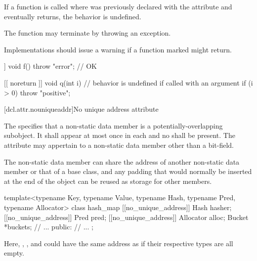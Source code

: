 \pnum
If a function  is called where  was previously declared with the 
attribute and  eventually returns, the behavior is undefined. \begin{note} The function may
terminate by throwing an exception. \end{note} \begin{note} Implementations should issue a
warning if a function marked \tcode{[[noreturn]]} might return. \end{note}

\pnum
\begin{example}
\begin{codeblock}
[[ noreturn ]] void f() {
  throw "error";                // OK
}

[[ noreturn ]] void q(int i) {  // behavior is undefined if called with an argument 
  if (i > 0)
    throw "positive";
}
\end{codeblock}
\end{example}

[dcl.attr.nouniqueaddr]{No unique address attribute}%

\pnum
The  
specifies that a non-static data member
is a potentially-overlapping subobject.
It shall appear at most once in each 
and no  shall be present.
The attribute may appertain to a non-static data member
other than a bit-field.

\pnum
\begin{note}
The non-static data member can share the address of
another non-static data member or that of a base class,
and any padding that would normally be inserted
at the end of the object
can be reused as storage for other members.
\end{note}
\begin{example}
\begin{codeblock}
template<typename Key, typename Value,
         typename Hash, typename Pred, typename Allocator>
class hash_map {
  [[no_unique_address]] Hash hasher;
  [[no_unique_address]] Pred pred;
  [[no_unique_address]] Allocator alloc;
  Bucket *buckets;
  // ...
public:
  // ...
};
\end{codeblock}
Here, , , and 
could have the same address as 
if their respective types are all empty.
\end{example}
